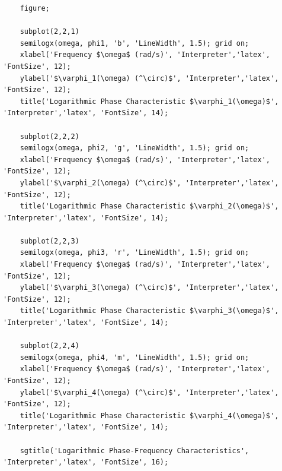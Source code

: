 \documentclass[a4paper, 12pt]{article}
\begin{document}
\begin{lstlisting}[label=task1, caption={Программа для задания 1}]
    % log phi(w)
    figure;

    subplot(2,2,1)
    semilogx(omega, phi1, 'b', 'LineWidth', 1.5); grid on;
    xlabel('Frequency $\omega$ (rad/s)', 'Interpreter','latex', 'FontSize', 12);
    ylabel('$\varphi_1(\omega) (^\circ)$', 'Interpreter','latex', 'FontSize', 12);
    title('Logarithmic Phase Characteristic $\varphi_1(\omega)$', 'Interpreter','latex', 'FontSize', 14);

    subplot(2,2,2)
    semilogx(omega, phi2, 'g', 'LineWidth', 1.5); grid on;
    xlabel('Frequency $\omega$ (rad/s)', 'Interpreter','latex', 'FontSize', 12);
    ylabel('$\varphi_2(\omega) (^\circ)$', 'Interpreter','latex', 'FontSize', 12);
    title('Logarithmic Phase Characteristic $\varphi_2(\omega)$', 'Interpreter','latex', 'FontSize', 14);

    subplot(2,2,3)
    semilogx(omega, phi3, 'r', 'LineWidth', 1.5); grid on;
    xlabel('Frequency $\omega$ (rad/s)', 'Interpreter','latex', 'FontSize', 12);
    ylabel('$\varphi_3(\omega) (^\circ)$', 'Interpreter','latex', 'FontSize', 12);
    title('Logarithmic Phase Characteristic $\varphi_3(\omega)$', 'Interpreter','latex', 'FontSize', 14);

    subplot(2,2,4)
    semilogx(omega, phi4, 'm', 'LineWidth', 1.5); grid on;
    xlabel('Frequency $\omega$ (rad/s)', 'Interpreter','latex', 'FontSize', 12);
    ylabel('$\varphi_4(\omega) (^\circ)$', 'Interpreter','latex', 'FontSize', 12);
    title('Logarithmic Phase Characteristic $\varphi_4(\omega)$', 'Interpreter','latex', 'FontSize', 14);

    sgtitle('Logarithmic Phase-Frequency Characteristics', 'Interpreter','latex', 'FontSize', 16);
    \end{lstlisting}
\end{document}
